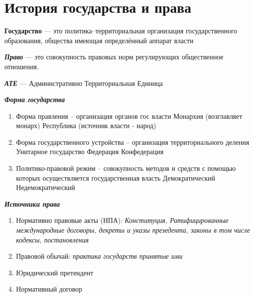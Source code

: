 \documentclass[14pt]{extarticle}
\begin{document}
	\section{История государства и права}
	\textbf{Государство} --- это политика--территориальная организация государственного образования, общества имеющая определённый аппарат власти
	
	\textbf{\textit{Право}} --- это совокупность правовых норм регулирующих общественное отношения.
	
	\textbf{\textit{АТЕ}} --- Административно Территориальная Единица
	
	\begin{center}
		\textbf{\textit{Форма государства}}
	\end{center}
	\begin{enumerate}
		\item Форма правления -- организация органов гос власти
			\subitem Монархия (возглавляет монарх)
			\subitem Республика (источник власти - народ)
		\item Форма государственного устройства -- организация территориального деления
			\subitem Унитарное государство
			\subitem Федерация 
			\subitem Конфедерация
		\item Политико-правовой режим -- совокупность методов и средств с помощью которых осуществляется государственная власть
			\subitem Демократический
			\subitem Недемократический
	\end{enumerate}  
	
	\newpage	
	\begin{center}
	\textbf{\textit{Источники права}}
	\end{center}
	\begin{enumerate}
		\item Нормативно правовые акты (НПА): \textit{Конституция, Ратифицированные международные договоры, декреты и указы презедента, законы в том числе кодексы, постановления}
		\item Правовой обычай: \textit{практика государств принятые ими}
		\item Юридический претендент
		\item Нормативный договор
	\end{enumerate}
\end{document}
